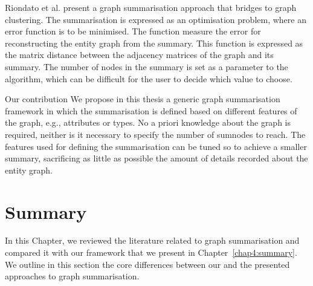 Riondato et al. \cite{riondato:2014:gsq} present a graph summarisation approach that bridges to graph clustering. The summarisation is expressed as an optimisation problem, where an error function is to be minimised. The function measure the error for reconstructing the entity graph from the summary. This function is expressed as the matrix distance between the adjacency matrices of the graph and its summary. The number of nodes in the summary is set as a parameter to the algorithm, which can be difficult for the user to decide which value to choose.\\

\begin{centeremph}{Our contribution}
	We propose in this thesis a generic graph summarisation framework in which the summarisation is defined based on different features of the graph, e.g., attributes or types. No a priori knowledge about the graph is required, neither is it necessary to specify the number of sumnodes to reach. The features used for defining the summarisation can be tuned so to achieve a smaller summary, sacrificing as little as possible the amount of details recorded about the entity graph.
\end{centeremph}

%

\section{Summary}

In this Chapter, we reviewed the literature related to graph summarisation and compared it with our framework that we present in Chapter~\ref{chap4:summary}. We outline in this section the core differences between our and the presented approaches to graph summarisation.

